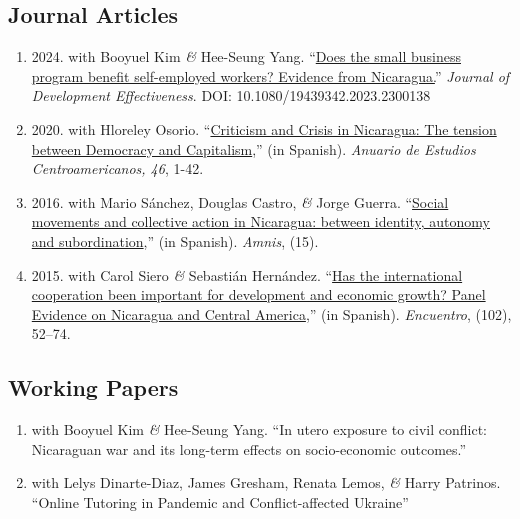 \documentclass[a4paper, 10pt]{article}
\begin{document}
\subsection*{Journal Articles}

\begin{enumerate}[leftmargin=10pt, label={}, itemindent=-10pt, nosep]
\item 2024. with Booyuel Kim \textit{\&} Hee-Seung Yang. ``\href{https://www.tandfonline.com/doi/full/10.1080/19439342.2023.2300138}{Does the small business
  program benefit self-employed workers? Evidence from Nicaragua.}''
  \textit{Journal of Development Effectiveness}. DOI: 10.1080/19439342.2023.2300138

\item 2020. with Hloreley Osorio. ``\href{https://revistas.ucr.ac.cr/index.php/anuario/article/view/45081/44860}{Criticism and Crisis in Nicaragua: The tension between Democracy and Capitalism},'' (in Spanish). \emph{Anuario de Estudios Centroamericanos, 46}, 1-42.

\item 2016. with Mario Sánchez, Douglas Castro, \textit{\&} Jorge Guerra. ``\href{https://amnis.revues.org/2813}{Social movements and collective action in Nicaragua: between identity, autonomy and subordination},'' (in Spanish). \emph{Amnis}, (15).

\item 2015. with Carol Siero \textit{\&} Sebastián Hernández. ``\href{http://www.uca.edu.ni/2/images/Revista-Encuentro/Revistas/e102/art-5.pdf}{Has the international cooperation been important for development and economic growth? Panel Evidence on Nicaragua and Central America},'' (in Spanish). \emph{Encuentro}, (102), 52--74.
\end{enumerate}

\subsection*{Working Papers}

\begin{enumerate}[leftmargin=10pt, label={}, itemindent=-10pt, nosep]
\item with Booyuel Kim \textit{\&} Hee-Seung Yang. ``In utero exposure to civil conflict: Nicaraguan war and its long-term effects on socio-economic outcomes.''
\item with Lelys Dinarte-Diaz, James Gresham, Renata Lemos, \textit{\&} Harry
Patrinos. ``Online Tutoring in Pandemic and Conflict-affected Ukraine''
\end{enumerate}
\end{document}
